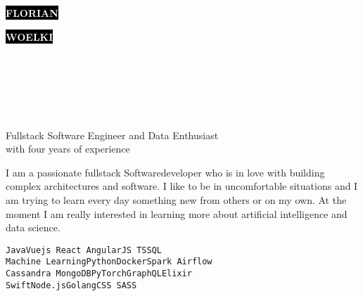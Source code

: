 \documentclass[9pt]{cvstyle}
\begin{document}
\begin{minipage}[t]{0.45\textwidth} 
	\vspace{-\baselineskip}
	
	\colorbox{black}{{\HUGE\textcolor{white}{\textbf{\MakeUppercase{Florian}}}}}
	
	\colorbox{black}{{\HUGE\textcolor{white}{\textbf{\MakeUppercase{Woelki}}}}}
	
	\vspace{6pt}
\end{minipage}
\begin{minipage}[t]{0.275\textwidth}
	\vspace{-\baselineskip}
	
	\\
	\\	
\end{minipage}
\begin{minipage}[t]{0.275\textwidth}
	\vspace{-\baselineskip}
	
	\\
	\\
\end{minipage}
	
{\huge Fullstack Software Engineer and Data Enthusiast\\ with four years of experience}

\vspace{0.25cm}

\begin{minipage}[t]{0.48\textwidth} 
	
	I am a passionate fullstack Softwaredeveloper who is in love with building complex
	architectures and software. I like to be in uncomfortable situations and I am trying
	to learn every day something new from others or on my own. At the moment I am really
	interested in learning more about artificial intelligence and data science.\\ 
\end{minipage}
\hfill
\begin{minipage}[t]{0.48\textwidth} 

	\texttt{Java}\hfill\texttt{Vuejs React Angular}\hfill\texttt{JS TS}\hfill\texttt{SQL} \\
	\texttt{Machine Learning}\hfill\texttt{Python}\hfill\texttt{Docker}\hfill\texttt{Spark Airflow}\\
	\texttt{Cassandra MongoDB}\hfill\texttt{PyTorch}\hfill\texttt{GraphQL}\hfill\texttt{Elixir}\\
	\texttt{Swift}\hfill\texttt{Node.js}\hfill\texttt{Golang}\hfill\texttt{CSS SASS}\\
\end{minipage}
\end{document}
